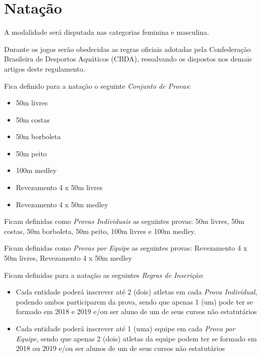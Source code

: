 {\let\clearpage\relax \chapter{Natação}}

\begin{article}
	A modalidade será disputada nas categorias feminina e masculina.
\end{article}

\begin{article}
	Durante os jogos serão obedecidas as regras oficiais adotadas pela Confederação Brasileira de Desportos Aquáticos (CBDA), ressalvando os dispostos nos demais artigos deste regulamento.

	Fica definido para a natação o seguinte \textit{Conjunto de Provas}:
	\begin{itemize}[noitemsep]
		\item 50m livres
		\item 50m costas
		\item 50m borboleta
		\item 50m peito
		\item 100m medley
		\item Revezamento 4 x 50m livres
		\item Revezamento 4 x 50m medley
	\end{itemize}

	\begin{xparagraph}
		Ficam definidas como \textit{Provas Individuais} as seguintes provas: 50m livres, 50m costas, 50m borboleta, 50m peito, 100m livres e 100m medley.
	\end{xparagraph}

	\begin{xparagraph}
		Ficam definidas como \textit{Provas por Equipe} as seguintes provas: Revezamento 4 x 50m livres, Revezamento 4 x 50m medley
	\end{xparagraph}
\end{article}

\noindent
Ficam definidas para a natação as seguintes \textit{Regras de Inscrição}:
\begin{itemize}[noitemsep]
	\item Cada entidade poderá inscrever até 2 (dois) atletas em cada \textit{Prova Individual}, podendo ambos participarem da prova, sendo que apenas 1 (um) pode ter se formado em 2018 e 2019 e/ou ser aluno de um de seus cursos não estatutários
	\item Cada entidade poderá inscrever até 1 (uma) equipe em cada \textit{Prova por Equipe}, sendo que apenas 2 (dois) atletas da equipe podem ter se formado em 2018 ou 2019 e/ou ser alunos de um de seus cursos não estatutários
\end{itemize}

